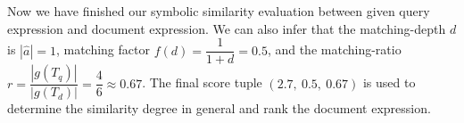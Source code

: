 Now we have finished our symbolic similarity evaluation between given query expression and document expression. 
We can also infer that the matching-depth $d$ is $|\hat{a}| = 1$, matching factor 
$f(d) = \dfrac{1}{1 + d} = 0.5$, 
and the matching-ratio $r=\dfrac{|g(T_q)|}{|g(T_d)|} = \dfrac{4}{6} \approx 0.67$. 
The final score tuple $(2.7,\ 0.5,\ 0.67)$ is used to determine the similarity degree in general and rank the document expression.
